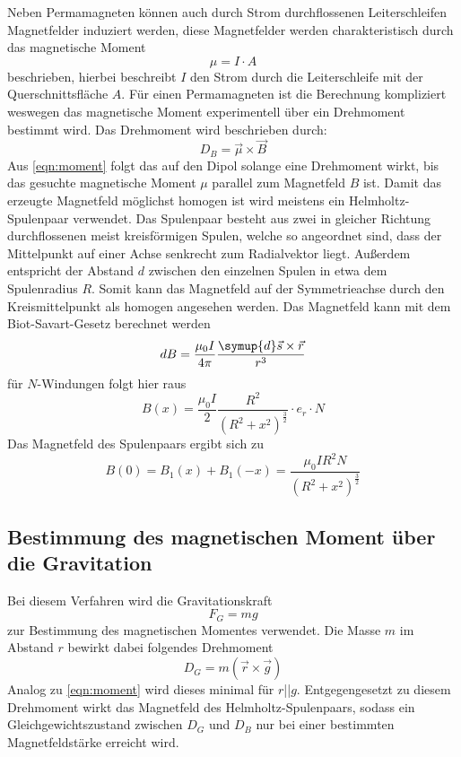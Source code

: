 \documentclass[
  bibliography=totoc,     %
  captions=tableheading,  %
  titlepage=firstiscover, %
]{scrartcl}
\begin{document}
  Neben Permamagneten können auch durch Strom durchflossenen Leiterschleifen Magnetfelder induziert werden, diese Magnetfelder werden charakteristisch durch das magnetische Moment 
  \begin{equation}
  \mu =I\cdot A
  \label{eqn:auswertung1}
  \end{equation}
  beschrieben, hierbei beschreibt $I$ den Strom durch die Leiterschleife mit der Querschnittsfläche $A$. Für einen Permamagneten ist die Berechnung kompliziert weswegen das 
  magnetische Moment experimentell über ein Drehmoment bestimmt wird. Das Drehmoment wird beschrieben durch: 
  \begin{equation}
    D_B=\vec{\mu} \times \vec{B}
    \label{eqn:moment}
    \end{equation}
    Aus \autoref{eqn:moment} folgt das auf den Dipol solange eine Drehmoment wirkt, bis das gesuchte magnetische Moment $\mu$ parallel zum Magnetfeld $B$ ist.
    Damit das erzeugte Magnetfeld möglichst homogen ist wird meistens ein Helmholtz-Spulenpaar verwendet. Das Spulenpaar besteht aus zwei in gleicher Richtung 
    durchflossenen meist kreisförmigen Spulen, welche so angeordnet sind, dass der Mittelpunkt auf einer Achse senkrecht zum Radialvektor liegt. Außerdem entspricht 
    der Abstand $d$ zwischen den einzelnen Spulen in etwa dem Spulenradius $R$. Somit kann das Magnetfeld auf der Symmetrieachse durch den Kreismittelpunkt als 
    homogen angesehen werden. Das Magnetfeld kann mit dem Biot-Savart-Gesetz berechnet werden
    \begin{equation*}
      dB=\frac{\mu_0I}{4\pi}\frac{\symup{d}\vec{s}\times \vec{r}}{r^3}
      \end{equation*}
      für $N$-Windungen folgt hier raus
      \begin{equation}
        B(x)=\frac{\mu_0I}{2}\frac{R^2}{(R^2+x^2)^\frac{3}{2}}\cdot e_r\cdot N
        \end{equation}
        Das Magnetfeld des Spulenpaars ergibt sich zu
        \begin{equation}
        B(0)=B_1(x)+B_1(-x)=\frac{\mu_0IR^2N}{(R^2+x^2)^\frac{3}{2}}
        \end{equation}
        
    \subsection{Bestimmung des magnetischen Moment über die Gravitation}
    Bei diesem Verfahren wird die Gravitationskraft 
        \begin{equation*}
          F_G=mg
        \end{equation*}
        zur Bestimmung des magnetischen Momentes verwendet. Die Masse $m$ im Abstand $r$ bewirkt dabei folgendes Drehmoment
        \begin{equation}
        D_G=m(\vec{r}\times \vec{g})
        \end{equation}
        Analog zu \autoref{eqn:moment} wird dieses minimal für $r$||$g$. Entgegengesetzt zu diesem Drehmoment wirkt das Magnetfeld des Helmholtz-Spulenpaars, 
        sodass ein Gleichgewichtszustand zwischen $D_G$ und $D_B$ nur bei einer bestimmten Magnetfeldstärke erreicht wird.
      
\end{document}
